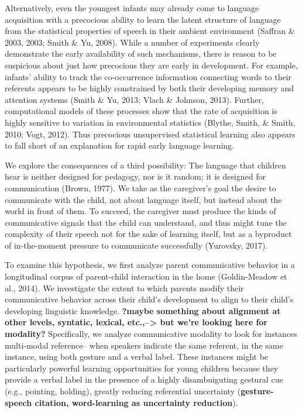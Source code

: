 \documentclass[10pt, letterpaper]{article}
\begin{document}
Alternatively, even the youngest infants may already come to language
acquisition with a precocious ability to learn the latent structure of
language from the statistical properties of speech in their ambient
environment (Saffran \& 2003, 2003; Smith \& Yu, 2008). While a number
of experiments clearly demonstrate the early availability of such
mechanisms, there is reason to be suspicious about just how precocious
they are early in development. For example, infants' ability to track
the co-occurrence information connecting words to their referents
appears to be highly constrained by both their developing memory and
attention systems (Smith \& Yu, 2013; Vlach \& Johnson, 2013). Further,
computational models of these processes show that the rate of
acquisition is highly sensitive to variation in environmental statistics
(Blythe, Smith, \& Smith, 2010; Vogt, 2012). Thus precocious
unsupervised statistical learning also appears to fall short of an
explanation for rapid early language learning.

We explore the consequences of a third possibility: The language that
children hear is neither designed for pedagogy, nor is it random; it is
designed for communication (Brown, 1977). We take as the caregiver's
goal the desire to communicate with the child, not about language
itself, but instead about the world in front of them. To succeed, the
caregiver must produce the kinds of communicative signals that the child
can understand, and thus might tune the complexity of their speech not
for the sake of learning itself, but as a byproduct of in-the-moment
pressure to communicate successfully (Yurovsky, 2017).

To examine this hypothesis, we first analyze parent communicative
behavior in a longitudinal corpus of parent-child interaction in the
home (Goldin-Meadow et al., 2014). We investigate the extent to which
parents modify their communicative behavior across their child's
development to align to their child's developing linguistic knowledge.
\textbf{?maybe something about alignment at other levels, syntatic,
lexical, etc.,--\textgreater{} but we're looking here for modality?}
Specifically, we analyze communicative modality to look for instances
multi-modal reference-- when speakers indicate the same referent, in the
same instance, using both gesture and a verbal label. These instances
might be particularly powerful learning opportunities for young children
because they provide a verbal label in the presence of a highly
disambuiguting gestural cue (e.g., pointing, holding), greatly reducing
referential uncertainty (\textbf{gesture-speech citation, word-learning
as uncertainty reduction}).
\end{document}
